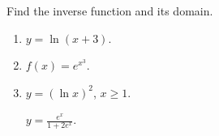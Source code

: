 Find the inverse function and its domain. 
\begin{enumerate}[ref={\fcProblemRef}]
\item  \label{problemFindInversey=ln(x+3)} $\displaystyle y=\ln (x+3)$.

\item  $f(x)=e^{x^3}$.


\item \label{problemFindInversey=(lnx)^2} $\displaystyle y=(\ln x)^2$, $x\geq 1$.


 \label{problemFindInversey=e^x/(1+2e^x)}  $\displaystyle y=\frac{e^x}{1+2e^x}$.

\end{enumerate}
